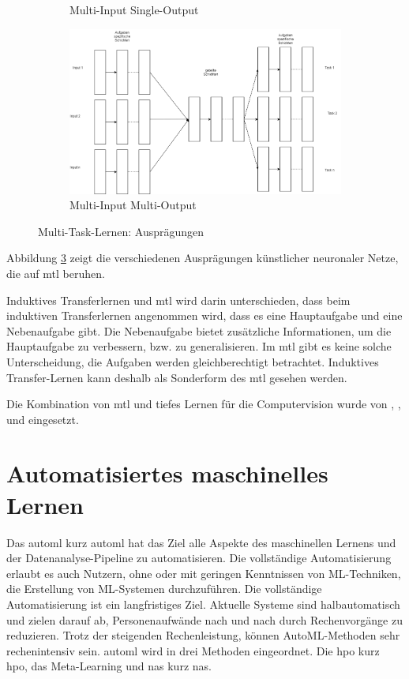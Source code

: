 \begin{figure}[h]
\begin{subfigure}[c]{0.49\textwidth}
				\caption[MTL-MISO]{Multi-Input Single-Output}
				\label{img:MTL_MISO}	
			\end{subfigure}
			\begin{subfigure}[c]{0.49\textwidth}			
				\includegraphics[width=1\textwidth, center]{bilder/Grundlagen/MTL/MTL_MIMO.png}
				\caption[MTL-MIMO]{Multi-Input Multi-Output}
				\label{img:MTL-MIMO}	
			\end{subfigure}
			\caption{Multi-Task-Lernen: Ausprägungen}
			\label{img:MultiTaskLernen}
		\end{figure}
		Abbildung \ref{img:MultiTaskLernen} zeigt die verschiedenen Ausprägungen künstlicher neuronaler Netze, die auf \ac{mtl} beruhen.
		
		Induktives Transferlernen und \ac{mtl} wird darin unterschieden, dass beim induktiven Transferlernen angenommen wird, dass es eine Hauptaufgabe und eine Nebenaufgabe gibt. Die Nebenaufgabe bietet zusätzliche Informationen, um die Hauptaufgabe zu verbessern, bzw. zu generalisieren. Im \ac{mtl} gibt es keine solche Unterscheidung, die Aufgaben werden gleichberechtigt betrachtet. Induktives Transfer-Lernen kann deshalb als Sonderform des \ac{mtl} gesehen werden. 
		
		Die Kombination von \acl{mtl} und tiefes Lernen für die Computervision wurde von \cite{YuchunFang.2017}, \cite{Li.2016}, \cite{RajeevRanjan.2016} und \cite{Zhao.2019} eingesetzt.

	\section{Automatisiertes maschinelles Lernen}
	\label{sec:AutoML}
	Das \acl{automl} kurz \ac{automl} hat das Ziel alle Aspekte des maschinellen Lernens und der Datenanalyse-Pipeline zu automatisieren. Die vollständige Automatisierung erlaubt es auch Nutzern, ohne oder mit geringen Kenntnissen von ML-Techniken, die Erstellung von ML-Systemen durchzuführen.
	Die vollständige Automatisierung ist ein langfristiges Ziel. Aktuelle Systeme sind halbautomatisch und zielen darauf ab, Personenaufwände nach und nach durch Rechenvorgänge zu reduzieren. Trotz der steigenden Rechenleistung, können AutoML-Methoden sehr rechenintensiv sein. \ac{automl} wird in drei Methoden eingeordnet. Die \acl{hpo} kurz \ac{hpo}, das  Meta-Learning und \acl{nas} kurz \ac{nas}. 
	\cite{Hutter.2019} 
	
